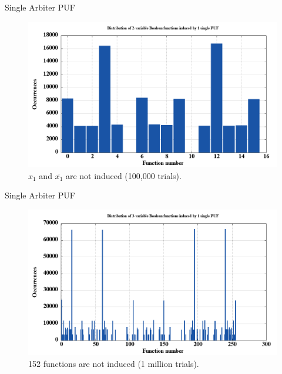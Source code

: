\documentclass[10pt, compress]{beamer}
\begin{document}
\begin{frame}{Single Arbiter PUF}
    \begin{figure}
        \centering
        \includegraphics[width=\textwidth]{figures/dist/distribution_of_2-variable_boolean_functions_induced_by_1_single_puf.png}
        \caption{$x_1$ and $\overline{x_1}$ are not induced (100,000 trials).}
    \end{figure}
\end{frame}

\begin{frame}{Single Arbiter PUF}
    \begin{figure}
        \centering
        \includegraphics[width=\textwidth]{figures/dist/distribution_of_3-variable_boolean_functions_induced_by_1_single_puf.png}
        \caption{152 functions are not induced (1 million trials).}
    \end{figure}
\end{frame}
\end{document}
